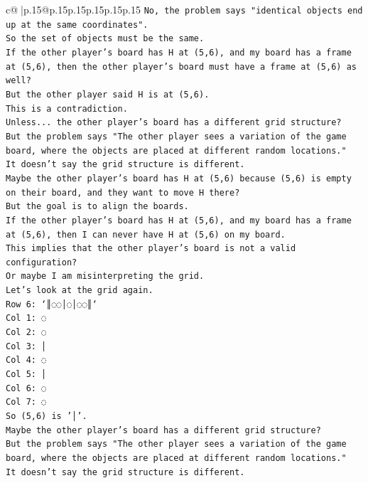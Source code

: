 \documentclass{article}
\begin{document}
{\begin{supertabular}{c@{$\;$}|p{.15\linewidth}@{}p{.15\linewidth}p{.15\linewidth}p{.15\linewidth}p{.15\linewidth}p{.15\linewidth}}
{{{\texttt{No, the problem says "identical objects end up at the same coordinates".} \\
\texttt{So the set of objects must be the same.} \\
\texttt{If the other player's board has H at (5,6), and my board has a frame at (5,6), then the other player's board must have a frame at (5,6) as well?} \\
\texttt{But the other player said H is at (5,6).} \\
\texttt{This is a contradiction.} \\
\texttt{Unless... the other player's board has a different grid structure?} \\
\texttt{But the problem says "The other player sees a variation of the game board, where the objects are placed at different random locations."} \\
\texttt{It doesn't say the grid structure is different.} \\
\texttt{Maybe the other player's board has H at (5,6) because (5,6) is empty on their board, and they want to move H there?} \\
\texttt{But the goal is to align the boards.} \\
\texttt{If the other player's board has H at (5,6), and my board has a frame at (5,6), then I can never have H at (5,6) on my board.} \\
\texttt{This implies that the other player's board is not a valid configuration?} \\
\texttt{Or maybe I am misinterpreting the grid.} \\
\texttt{Let's look at the grid again.} \\
\texttt{Row 6: `║◌◌│◌│◌◌║`} \\
\texttt{Col 1: ◌} \\
\texttt{Col 2: ◌} \\
\texttt{Col 3: │} \\
\texttt{Col 4: ◌} \\
\texttt{Col 5: │} \\
\texttt{Col 6: ◌} \\
\texttt{Col 7: ◌} \\
\texttt{So (5,6) is '│'.} \\
\texttt{Maybe the other player's board has a different grid structure?} \\
\texttt{But the problem says "The other player sees a variation of the game board, where the objects are placed at different random locations."} \\
\texttt{It doesn't say the grid structure is different.} \\
}}}
\end{supertabular}}
\end{document}
